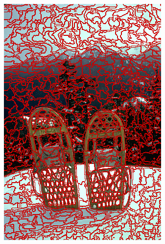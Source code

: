 \begin{figure}
{		\includegraphics[scale=\scalefivebsdtest]{pictures/bsd-test-4-crs}
	}
	\subfigure{
}
\end{figure}
